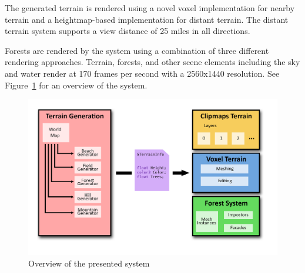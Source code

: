 The generated terrain is rendered using a novel voxel implementation for nearby terrain and a heightmap-based implementation for distant terrain.
The distant terrain system supports a view distance of 25 miles in all directions.

Forests are rendered by the system using a combination of three different rendering approaches.
Terrain, forests, and other scene elements including the sky and water render at 170 frames per second with a 2560x1440 resolution.
See Figure~\ref{fig:system1} for an overview of the system.

\begin{figure}
  \centering
    \includegraphics[width=1.0\textwidth]{figures/SystemDiagram.png}
  \caption{Overview of the presented system}
  \label{fig:system1}
\end{figure}
